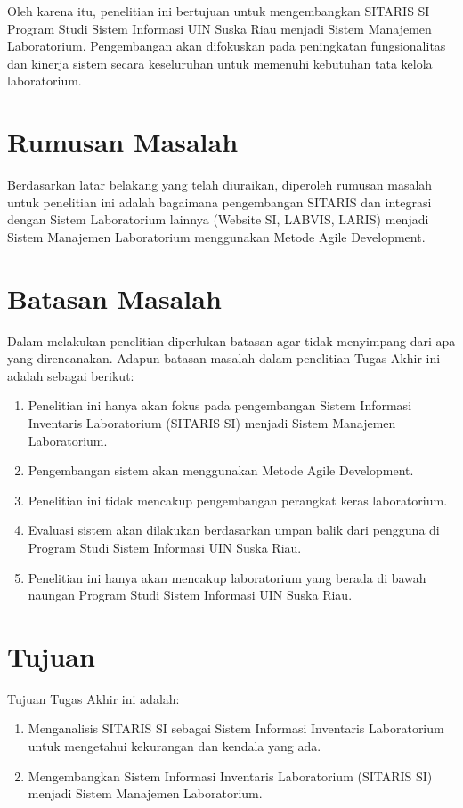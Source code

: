 Oleh karena itu, penelitian ini bertujuan untuk mengembangkan SITARIS SI Program Studi Sistem Informasi UIN Suska Riau menjadi Sistem Manajemen Laboratorium. Pengembangan akan difokuskan pada peningkatan fungsionalitas dan kinerja sistem secara keseluruhan untuk memenuhi kebutuhan tata kelola laboratorium.
\section{Rumusan Masalah}
Berdasarkan latar belakang yang telah diuraikan, diperoleh rumusan masalah untuk penelitian ini adalah bagaimana pengembangan SITARIS dan integrasi dengan Sistem Laboratorium lainnya (Website SI, LABVIS, LARIS) menjadi Sistem Manajemen Laboratorium menggunakan Metode Agile Development.

\section{Batasan Masalah}
Dalam melakukan penelitian diperlukan batasan agar tidak menyimpang dari apa yang direncanakan. Adapun batasan masalah dalam penelitian Tugas Akhir ini adalah sebagai berikut:
\begin{enumerate}
	\item Penelitian ini hanya akan fokus pada pengembangan Sistem Informasi Inventaris Laboratorium (SITARIS SI) menjadi Sistem Manajemen Laboratorium.
	\item Pengembangan sistem akan menggunakan Metode Agile Development.
	\item Penelitian ini tidak mencakup pengembangan perangkat keras laboratorium.
	\item Evaluasi sistem akan dilakukan berdasarkan umpan balik dari pengguna di Program Studi Sistem Informasi UIN Suska Riau.
	\item Penelitian ini hanya akan mencakup laboratorium yang berada di bawah naungan Program Studi Sistem Informasi UIN Suska Riau.
\end{enumerate}

\section{Tujuan}
Tujuan Tugas Akhir ini adalah:
\begin{enumerate}
	\item Menganalisis SITARIS SI sebagai Sistem Informasi Inventaris Laboratorium untuk mengetahui kekurangan dan kendala yang ada.
	\item Mengembangkan Sistem Informasi Inventaris Laboratorium (SITARIS SI) menjadi Sistem Manajemen Laboratorium.
\end{enumerate}

